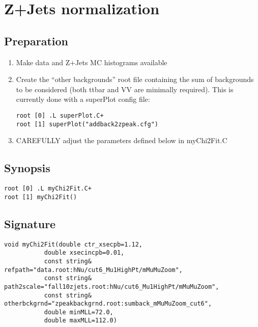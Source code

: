 \documentclass[english]{article}
\begin{document}
\section{Z+Jets normalization}

\subsection{Preparation}
\begin{enumerate}
\item Make data and Z+Jets MC histograms available
\item Create the ``other backgrounds'' root file containing the sum of backgrounds to be considered
   (both ttbar and VV are minimally required). This is currently done with a superPlot config file:
\begin{lstlisting}
root [0] .L superPlot.C+
root [1] superPlot("addback2zpeak.cfg")
\end{lstlisting}
\item CAREFULLY adjust the parameters defined below in myChi2Fit.C
\end{enumerate}

\subsection{Synopsis}
\begin{lstlisting}
root [0] .L myChi2Fit.C+
root [1] myChi2Fit()
\end{lstlisting}

\subsection{Signature}
\begin{lstlisting}
void myChi2Fit(double ctr_xsecpb=1.12,
	       double xsecincpb=0.01,
	       const string& refpath="data.root:hNu/cut6_Mu1HighPt/mMuMuZoom",
	       const string& path2scale="fall10zjets.root:hNu/cut6_Mu1HighPt/mMuMuZoom",
	       const string& otherbckgrnd="zpeakbackgrnd.root:sumback_mMuMuZoom_cut6",
	       double minMLL=72.0,
	       double maxMLL=112.0)
\end{lstlisting}

\end{document}
